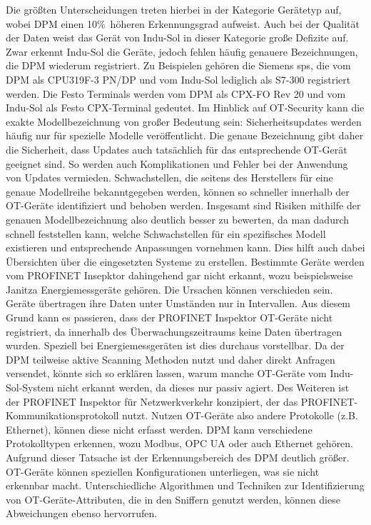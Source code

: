 \noindent Die größten Unterscheidungen treten hierbei in der Kategorie Gerätetyp auf, wobei DPM einen 10\%\ höheren Erkennungsgrad aufweist. Auch bei der Qualität der Daten weist das Gerät von Indu-Sol in dieser Kategorie große Defizite auf. Zwar erkennt Indu-Sol die Geräte, jedoch fehlen häufig genauere Bezeichnungen, die DPM wiederum registriert. Zu Beispielen gehören die Siemens \ac{sps}, die vom DPM als CPU319F-3 PN/DP und vom Indu-Sol lediglich als S7-300 registriert werden. Die Festo Terminals werden vom DPM als CPX-FO Rev 20 und vom Indu-Sol als Festo CPX-Terminal gedeutet. Im Hinblick auf OT-Security kann die exakte Modellbezeichnung von großer Bedeutung sein: Sicherheitsupdates werden häufig nur für spezielle Modelle veröffentlicht. Die genaue Bezeichnung gibt daher die Sicherheit, dass Updates auch tatsächlich für das entsprechende OT-Gerät geeignet sind. So werden auch Komplikationen und Fehler bei der Anwendung von Updates vermieden. Schwachstellen, die seitens des Herstellers für eine genaue Modellreihe bekanntgegeben werden, können so schneller innerhalb der OT-Geräte identifiziert und behoben werden. Insgesamt sind Risiken mithilfe der genauen Modellbezeichnung also deutlich besser zu bewerten, da man dadurch schnell feststellen kann, welche Schwachstellen für ein spezifisches Modell existieren und entsprechende Anpassungen vornehmen kann. Dies hilft auch dabei Übersichten über die eingesetzten Systeme zu erstellen. Bestimmte Geräte werden vom PROFINET Insepktor dahingehend gar nicht erkannt, wozu beispielsweise Janitza Energiemessgeräte gehören. Die Ursachen können verschieden sein. Geräte übertragen ihre Daten unter Umständen nur in Intervallen. Aus diesem Grund kann es passieren, dass der PROFINET Inspektor OT-Geräte nicht registriert, da innerhalb des Überwachungszeitraums keine Daten übertragen wurden. Speziell bei Energiemessgeräten ist dies durchaus vorstellbar. Da der DPM teilweise aktive Scanning Methoden nutzt und daher direkt Anfragen versendet, könnte sich so erklären lassen, warum manche OT-Geräte vom Indu-Sol-System nicht erkannt werden, da dieses nur passiv agiert. Des Weiteren ist der PROFINET Inspektor für Netzwerkverkehr konzipiert, der das PROFINET-Kommunikationsprotokoll nutzt. Nutzen OT-Geräte also andere Protokolle (z.B. Ethernet), können diese nicht erfasst werden. DPM kann verschiedene Protokolltypen erkennen, wozu Modbus, OPC UA oder auch Ethernet gehören. Aufgrund dieser Tatsache ist der Erkennungsbereich des DPM deutlich größer. OT-Geräte können speziellen Konfigurationen unterliegen, was sie nicht erkennbar macht. Unterschiedliche Algorithmen und Techniken zur Identifizierung von OT-Geräte-Attributen, die in den Sniffern genutzt werden, können diese Abweichungen ebenso hervorrufen.

